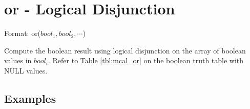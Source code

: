 
%

\section{or - Logical Disjunction\label{sect:or}}

Format: or($bool_1,bool_2,\cdots$)

Compute the boolean result using logical disjunction on the array of boolean values in $bool_i$. Refer to Table \ref{tbl:mcal_or} on the boolean truth table with NULL values.



\subsection*{Examples}


%

